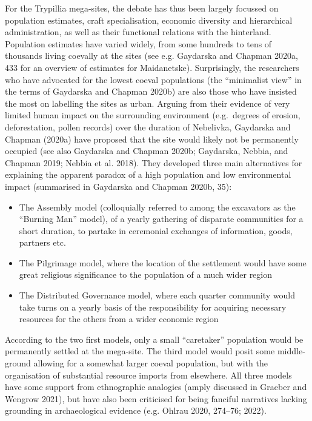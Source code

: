 \documentclass[
  12pt,
  a4paper, twoside]{book}
\begin{document}
For the Trypillia mega-sites, the debate has thus been largely focussed on population estimates, craft specialisation, economic diversity and hierarchical administration, as well as their functional relations with the hinterland. Population estimates have varied widely, from some hundreds to tens of thousands living coevally at the sites (see e.g. Gaydarska and Chapman 2020a, 433 for an overview of estimates for Maidanetske). Surprisingly, the researchers who have advocated for the lowest coeval populations (the ``minimalist view'' in the terms of Gaydarska and Chapman 2020b) are also those who have insisted the most on labelling the sites as urban. Arguing from their evidence of very limited human impact on the surrounding environment (e.g.~degrees of erosion, deforestation, pollen records) over the duration of Nebelivka, Gaydarska and Chapman (2020a) have proposed that the site would likely not be permanently occupied (see also Gaydarska and Chapman 2020b; Gaydarska, Nebbia, and Chapman 2019; Nebbia et al. 2018). They developed three main alternatives for explaining the apparent paradox of a high population and low environmental impact (summarised in Gaydarska and Chapman 2020b, 35):

\begin{itemize}
\item
  The Assembly model (colloquially referred to among the excavators as the ``Burning Man'' model), of a yearly gathering of disparate communities for a short duration, to partake in ceremonial exchanges of information, goods, partners etc.
\item
  The Pilgrimage model, where the location of the settlement would have some great religious significance to the population of a much wider region
\item
  The Distributed Governance model, where each quarter community would take turns on a yearly basis of the responsibility for acquiring necessary resources for the others from a wider economic region
\end{itemize}

According to the two first models, only a small ``caretaker'' population would be permanently settled at the mega-site. The third model would posit some middle-ground allowing for a somewhat larger coeval population, but with the organisation of substantial resource imports from elsewhere. All three models have some support from ethnographic analogies (amply discussed in Graeber and Wengrow 2021), but have also been criticised for being fanciful narratives lacking grounding in archaeological evidence (e.g. Ohlrau 2020, 274--76; 2022).
\end{document}
